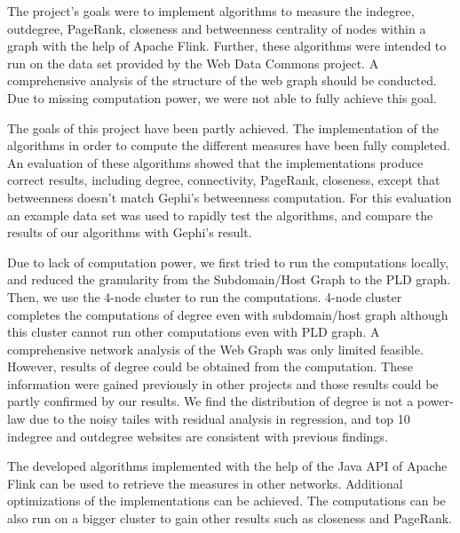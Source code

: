 The project's goals were to implement algorithms to measure the indegree, outdegree, PageRank, closeness and betweenness centrality of nodes within a graph with the  help of Apache Flink. Further, these algorithms were intended to run on the data set provided by the Web Data Commons project. A comprehensive analysis of the structure of the web graph should be conducted. Due to missing computation power, we were not able to fully achieve this goal.

The goals of this project have been partly achieved. The implementation of the algorithms in order to compute the different measures have been fully completed. An evaluation of these algorithms showed that the implementations produce correct results, including degree, connectivity, PageRank, closeness, except that betweenness doesn't match Gephi's betweenness computation. For this evaluation an example data set was used to rapidly test the algorithms, and compare the results of our algorithms with Gephi's result. 

Due to lack of computation power, we first tried to run the computations locally, and reduced the granularity from the Subdomain/Host Graph to the PLD graph. Then, we use the 4-node cluster to run the computations. 4-node cluster completes the computations of degree even with subdomain/host graph although this cluster cannot run other computations even with PLD graph. A comprehensive network analysis of the Web Graph was only limited feasible. However, results of degree could be obtained from the computation. These information were gained previously in other projects and those results could be partly confirmed by our results. We find the distribution of degree is not a power-law due to the noisy tailes with residual analysis in regression, and top 10 indegree and outdegree websites are consistent with previous findings.

The developed algorithms implemented with the help of the Java API of Apache Flink can be used to retrieve the measures in other networks. Additional optimizations of the implementations can be achieved. The computations can be also run on a bigger cluster to gain other results such as closeness and PageRank. 
